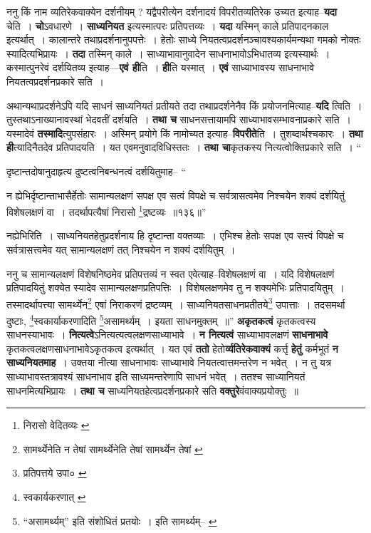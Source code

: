 \documentclass[article,12pt,a4paper]{memoir}
\begin{document}
	  \pstart ननु किं नाम व्यतिरेकवाक्येन दर्शनीयम् ? यद्वैपरीत्येन दर्शनादयं विपरीतव्यतिरेक उच्यत इत्याह--\textbf{यदा} चेति । \textbf{चो}ऽवधारणे । \textbf{साध्यनियत} इत्यस्मात्परः प्रतिपत्तव्यः । \textbf{यदा} यस्मिन् काले प्रतिपादनकाल इत्यर्थात् । कालान्तरे तथाप्रदर्शनानुपपत्तेः । हेतोः साध्ये नियतत्वप्रदर्शनञ्चावश्यकार्यमन्यथा गमको नोक्तः स्यादित्यभिप्रायः । \textbf{तदा} तस्मिन् काले । साध्याभावानुवादेन साधनाभावोऽभिधातव्य इत्यस्यार्थः । कस्मात्पुनरेवं दर्शयितव्य इत्याह—\textbf{एवं ही}ति । \textbf{ही}ति यस्मात् । \textbf{एवं} साध्याभावस्य साधनाभावे नियतत्वप्रदर्शनप्रकारे सति ।
	\pend
      

	  \pstart अथान्यथाप्रदर्शनेऽपि यदि साधनं साध्यनियतं प्रतीयते तदा तथाप्रदर्शनेनैव किं प्रयोजनमित्याह--\textbf{यदि} त्विति । तुस्तथाऽनाख्यानावस्थां भेदवतीं दर्शयति । \textbf{तथा च} साधनसत्तायामपि साध्याभावसम्भावनाप्रकारे सति । यस्मादेवं \textbf{तस्मादि}त्युपसंहारः । अस्मिन् प्रयोगे किं नामोच्यत इत्याह--\textbf{विपरीते}ति । तुशब्दार्थश्चकारः । \textbf{तथा ही}त्यादिनैतदेव प्रतिपादयति । यत एवमनुवादविधिस्ततः । \textbf{तथा चा}कृतकस्य नित्यत्वोक्तिप्रकारे सति ।   \leavevmode{} “
	  
	दृष्टान्तदोषानुदाहृत्य दुष्टत्वनिबन्धनत्वं दर्शयितुमाह-- “
	  
	न ह्येभिर्दृष्टान्ताभासैर्हेतोः सामान्यलक्षणं सपक्ष एव सत्वं विपक्षे च सर्वत्रासत्वमेव निश्चयेन शक्यं दर्शयितुं विशेषलक्षणं वा । तदर्थापत्यैषां निरासो \footnote{निरासो वेदितव्यः \cite{dp-msB} \cite{dp-msD} \cite{dp-edP} \cite{dp-edH} \cite{dp-edE} \cite{dp-edN}}\-द्रष्टव्यः ॥१३६॥” 
	  
	नह्येभिरिति । साध्यनियतहेतुप्रदर्शनाय हि दृष्टान्ता वक्तव्याः । एभिश्च हेतोः सपक्ष एव सत्त्वं विपक्षे च सर्वत्रासत्त्वमेव यत् सामान्यलक्षणं तत् निश्चयेन न शक्यं दर्शयितुम् । 
	  
	ननु च सामान्यलक्षणं विशेषनिष्ठमेव प्रतिपत्तव्यं न स्वत एवेत्याह--विशेषलक्षणं वा । यदि विशेषलक्षणं प्रतिपादयितुं शक्येत स्यादेव सामान्यलक्षणप्रतिपत्तिः । विशेषलक्षणमेव तु न शक्यमेभिः प्रतिपादयितुम् । तस्मादर्थापत्त्या सामर्थ्येन\footnote{सामर्थ्येनेति न तेषां \cite{dp-msA} \cite{dp-msB} \cite{dp-edP} सामर्थ्येनेति तेषां \cite{dp-edE} \cite{dp-edH} सामर्थ्येन तेषां \cite{dp-msD}} एषां निराकरणं द्रष्टव्यम् । साध्यनियतसाधनप्रतीतये\footnote{प्रतिपत्तये उपा० \cite{dp-msB}} उपात्ताः । तदसमर्था दुष्टाः, \footnote{स्वकार्यकरणात् \cite{dp-msA} \cite{dp-msB} \cite{dp-edP} \cite{dp-edH}}\-स्वकार्याकरणादिति \footnote{“असामर्थ्यम्” इति संशोधितं \cite{dp-msC} \cite{dp-msD} प्रतयोः । इति सामर्थ्यम्--\cite{dp-msA} \cite{dp-msB} \cite{dp-edP} \cite{dp-edH} \cite{dp-edE} \cite{dp-edN}}\-असामर्थ्यम् । इयता साधनमुक्तम् ॥” \textbf{अकृतकत्वं} कृतकत्वस्य साधनस्याभावः । \textbf{नित्यत्वे}ऽनित्यत्यत्वलक्षणसाध्याभावे । \textbf{न नित्यत्वं} साध्याभावलक्षणं \textbf{साधनाभावे} कृतकत्वलक्षणसाधनाभावेऽकृतकत्व इत्यर्थात् । यत एवं \textbf{ततो} हेतो\textbf{र्व्यतिरेकवाक्यं} कर्त्तृ \textbf{हेतुं} कर्मभूतं \textbf{न साध्यनियतमाह} । उक्तया नीत्या साधनाभावः साध्याभावे नियतत्वात्तमन्तरेण न भवेत् । न तु यत्र साध्याभावस्तत्रावश्यं साधनाभाव इति साध्यमन्तरेणापि साधनं भवेत् । ततश्च साध्यानियतं साधनमित्यभिप्रायः । \textbf{तथा च} साध्यनियतहेत्वप्रदर्शनप्रकारे सति \textbf{वक्तुरे}वंवाक्यप्रयोक्तुः ॥
	\pend
      
\end{document}
